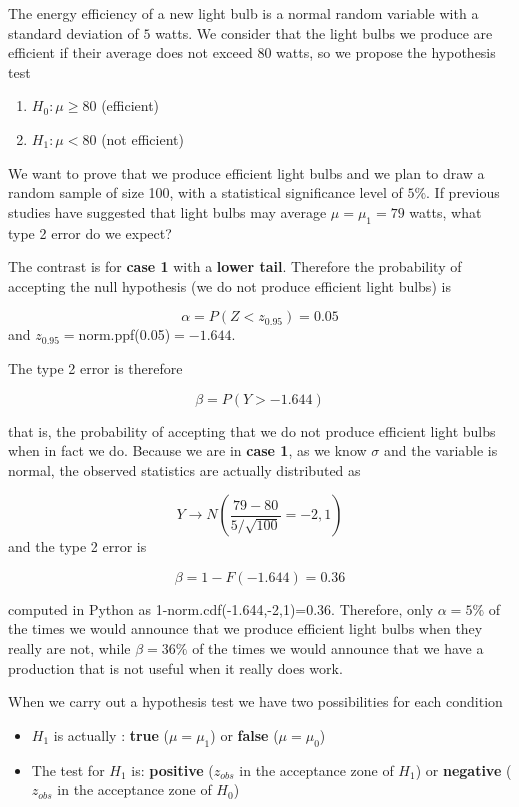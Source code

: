 \documentclass[
]{book}
\providecommand{\tightlist}{%
  \setlength{\itemsep}{0pt}\setlength{\parskip}{0pt}}
\begin{document}
The energy efficiency of a new light bulb is a normal random variable with a standard deviation of \(5\) watts. We consider that the light bulbs we produce are efficient if their average does not exceed \(80\) watts, so we propose the hypothesis test

\begin{enumerate}
\def\labelenumi{\alph{enumi}.}
\tightlist
\item
  \(H_0 : \mu \geq 80\) (efficient)
\item
  \(H_1 : \mu < 80\) (not efficient)
\end{enumerate}

We want to prove that we produce efficient light bulbs and we plan to draw a random sample of size 100, with a statistical significance level of \(5\%\). If previous studies have suggested that light bulbs may average \(\mu=\mu_1=79\) watts, what type 2 error do we expect?

The contrast is for \textbf{case 1} with a \textbf{lower tail}. Therefore the probability of accepting the null hypothesis (we do not produce efficient light bulbs) is

\[\alpha = P(Z< z_{0.95})=0.05\]
and \(z_{0.95}=\)norm.ppf(0.05)\(=-1.644\).

The type 2 error is therefore

\[\beta= P(Y > -1.644)\]

that is, the probability of accepting that we do not produce efficient light bulbs when in fact we do. Because we are in \textbf{case 1}, as we know \(\sigma\) and the variable is normal, the observed statistics are actually distributed as

\[Y \rightarrow N(\frac{79-80}{5/\sqrt{100}}=-2,1)\] and the type 2 error is

\[\beta = 1-F(-1.644)=0.36\]

computed in Python as 1-norm.cdf(-1.644,-2,1)=0.36. Therefore, only \(\alpha=5\%\) of the times we would announce that we produce efficient light bulbs when they really are not, while \(\beta=36\%\) of the times we would announce that we have a production that is not useful when it really does work.

When we carry out a hypothesis test we have two possibilities for each condition

\begin{itemize}
\tightlist
\item
  \(H_1\) is actually : \textbf{true} (\(\mu=\mu_1\)) or \textbf{false} (\(\mu=\mu_0\))
\item
  The test for \(H_1\) is: \textbf{positive} (\(z_{obs}\) in the acceptance zone of \(H_1\)) or \textbf{negative} (\(z_{obs}\) in the acceptance zone of \(H_0\))
\end{itemize}
\end{document}
